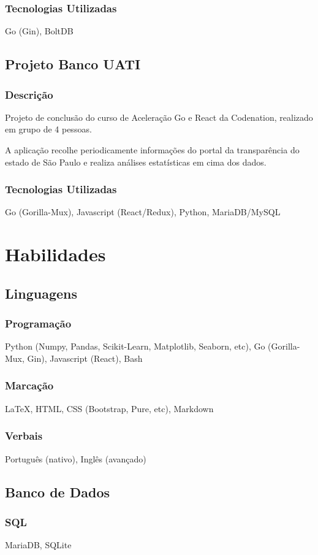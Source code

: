 \documentclass{article}
\begin{document}
\begin{multicols}{2}
\subsubsection{Tecnologias Utilizadas}
Go (Gin), BoltDB
\subsection{Projeto Banco UATI}
\subsubsection{Descri\c{c}\~ao}
Projeto de conclus\~ao do curso de Acelera\c{c}\~ao Go e React da Codenation, realizado em grupo de 4 pessoas.

A aplica\c{c}\~ao recolhe periodicamente informa\c{c}\~oes do portal da transpar\^encia do
estado de S\~ao Paulo e realiza an\'alises estat\'isticas em cima dos dados.
\subsubsection{Tecnologias Utilizadas}
Go (Gorilla-Mux), Javascript (React/Redux), Python, MariaDB/MySQL

\section{Habilidades}
\subsection{Linguagens}
\subsubsection{Programa\c{c}\~ao}
Python (Numpy, Pandas, Scikit-Learn, Matplotlib, Seaborn, etc), Go (Gorilla-Mux, Gin), Javascript (React), Bash	
\subsubsection{Marca\c{c}\~ao}
{\LaTeX}, HTML, CSS (Bootstrap, Pure, etc), Markdown
\subsubsection{Verbais}
Portugu\^es (nativo), Ingl\^es (avan\c{c}ado)
\subsection{Banco de Dados}
\subsubsection{SQL}
MariaDB, SQLite

\end{multicols}
\end{document}
